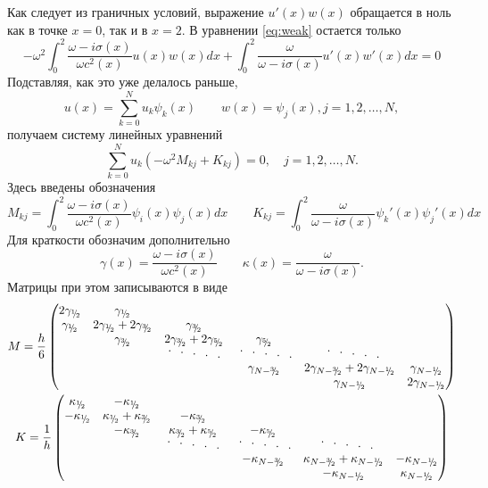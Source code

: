 \documentclass[12pt]{article}
\newcommand{\cutefrac}[2]{{}^{#1\!}\!/{\!}_#2}
\newcommand{\half}{\cutefrac{1}{2}}
\newcommand{\cuteddots}{
\text{
\raisebox{.6ex}{$\cdot$}\hspace{.75em}%
\raisebox{.3ex}{$\cdot$}\hspace{.75em}%
$\cdot$\hspace{.75em}%
\raisebox{-.3ex}{$\cdot$}\hspace{.75em}%
\raisebox{-.6ex}{$\cdot$}%
}}
\begin{document}
Как следует из граничных условий, выражение $u'(x)w(x)$ обращается в ноль как в
точке $x = 0$, так и в $x = 2$. В уравнении \eqref{eq:weak} остается только
\[
-\omega^2 \int_0^2 \frac{\omega - i\sigma(x)}{\omega c^2(x)} u(x) w(x) dx 
+\int_0^2 \frac{\omega}{\omega -i\sigma(x)} u'(x) w'(x) dx = 0 
\]
Подставляя, как это уже делалось раньше,
\[
u(x) = \sum_{k=0}^N u_k \psi_k(x) \qquad w(x) = \psi_j(x), j = 1, 2, \dots, N,
\]
получаем систему линейных уравнений
\begin{equation}
\sum_{k = 0}^N u_k (-\omega^2 M_{kj} + K_{kj}) = 0, \quad j = 1, 2, \dots, N.
\label{eq:system}
\end{equation}
Здесь введены обозначения
\[
M_{kj} = \int_0^2 \frac{\omega - i\sigma(x)}{\omega c^2(x)} \psi_i(x) \psi_j(x) dx
\qquad
K_{kj} = \int_0^2 \frac{\omega}{\omega -i\sigma(x)} \psi_k'(x) \psi_j'(x) dx
\]
Для краткости обозначим дополнительно
\[
\gamma(x) = \frac{\omega - i\sigma(x)}{\omega c^2(x)}
\qquad 
\kappa(x) = \frac{\omega}{\omega - i\sigma(x)}.
\]
Матрицы при этом записываются в виде
\begin{gather*}
M = \frac{h}{6}
\begin{pmatrix}
2\gamma_{\half} & \gamma_{\half} & \\
\gamma_{\half} & 2\gamma_{\half} + 2\gamma_{\cutefrac{3}{2}} & \gamma_{\cutefrac{3}{2}}\\
& \gamma_{\cutefrac{3}{2}} & 2\gamma_{\cutefrac{3}{2}} + 2\gamma_{\cutefrac{5}{2}} & \gamma_{\cutefrac{5}{2}}\\
& & \cuteddots\; & \cuteddots & \;\cuteddots \\
& & & \gamma_{N - \cutefrac{3}{2}} & 2\gamma_{N - \cutefrac{3}{2}} + 2\gamma_{N
- \half} & \gamma_{N-\half}\\
& & & & \gamma_{N - \half} & 2\gamma_{N-\half}
\end{pmatrix}
\\
K = \frac{1}{h}
\begin{pmatrix}
\kappa_{\half} & -\kappa_{\half} & \\
-\kappa_{\half} & \kappa_{\half} + \kappa_{\cutefrac{3}{2}} & -\kappa_{\cutefrac{3}{2}}\\
& -\kappa_{\cutefrac{3}{2}} & \kappa_{\cutefrac{3}{2}} + \kappa_{\cutefrac{5}{2}}
& -\kappa_{\cutefrac{5}{2}}\\
& & \cuteddots\; & \cuteddots & \;\cuteddots \\
& & & -\kappa_{N - \cutefrac{3}{2}} & \kappa_{N - \cutefrac{3}{2}} + \kappa_{N
- \half} & -\kappa_{N-\half}\\
& & & & -\kappa_{N - \half} & \kappa_{N-\half}
\end{pmatrix}
\end{gather*}
\end{document}
